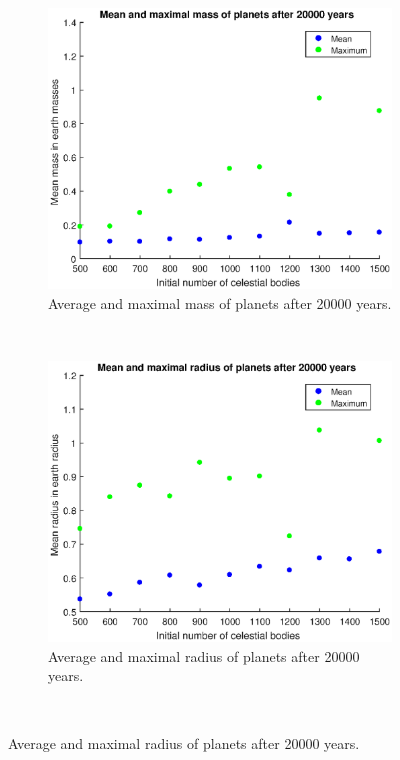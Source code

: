 \begin{figure}[H]
	\centering
	\begin{subfigure}{0.45\textwidth}
	\includegraphics[width=\textwidth]{EindmassaNieuw.eps}
	\caption{Average and maximal mass of planets after 20000 years.}
	\end{subfigure}
	~
	\begin{subfigure}{0.45\textwidth}
	\includegraphics[width=\textwidth]{EindstraalNieuw.eps}
	\caption{Average and maximal radius of planets after 20000 years.}
	\end{subfigure}
	~

\end{figure}
